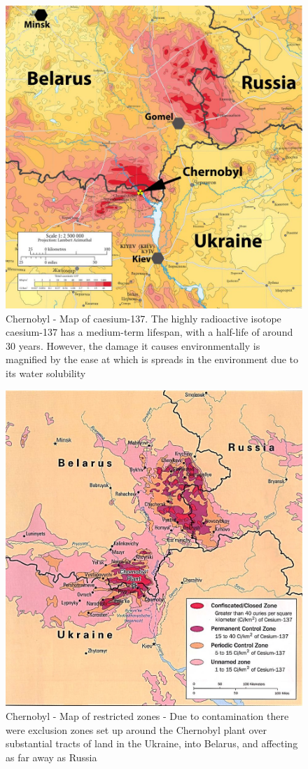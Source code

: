 {\begin{figure}
		\centering
		\includegraphics[width=0.5\linewidth]{chernobyl_caesium_137}
		\caption{Chernobyl - Map of caesium-137. The highly radioactive isotope caesium-137 has a medium-term lifespan, with a half-life of around 30 years. However, the damage it causes environmentally is magnified by the ease at which is spreads in the environment due to its water solubility}
		\label{fig:chernobylcaesium137}
	\end{figure}
}{}
\begin{figure}
	\centering
	\includegraphics[width=0.5\linewidth]{chernobyl_restricted_zones}
	\caption{Chernobyl - Map of restricted zones - Due to contamination there were exclusion zones set up around the Chernobyl plant over substantial tracts of land in the Ukraine, into Belarus, and affecting as far away as Russia}
	\label{fig:chernobylrestrictedzones}
\end{figure}

